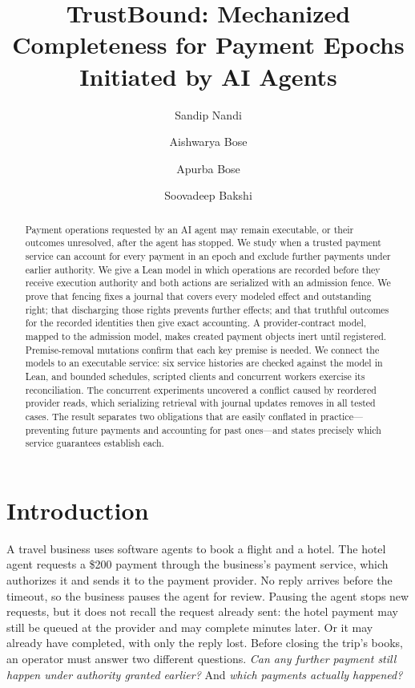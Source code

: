 \documentclass[runningheads]{llncs}
\begin{document}
\title{TrustBound: Mechanized Completeness for Payment Epochs Initiated by AI Agents}
\author{Sandip Nandi \and Aishwarya Bose \and Apurba Bose \and Soovadeep Bakshi}
\maketitle

\begin{abstract}
Payment operations requested by an AI agent may remain executable, or their
outcomes unresolved, after the agent has stopped. We study when a trusted
payment service can account for every payment in an epoch and exclude further
payments under earlier authority. We give a Lean model in which operations are
recorded before they receive execution authority and both actions are
serialized with an admission fence. We prove that fencing fixes a journal that
covers every modeled effect and outstanding right; that discharging those
rights prevents further effects; and that truthful outcomes for the recorded
identities then give exact accounting. A provider-contract model, mapped to the
admission model, makes created payment objects inert until registered.
Premise-removal mutations confirm that each key premise is needed. We connect
the models to an executable service: six service histories are checked against
the model in Lean, and bounded schedules, scripted clients and concurrent
workers exercise its reconciliation. The concurrent experiments uncovered a
conflict caused by reordered provider reads, which serializing retrieval with
journal updates removes in all tested cases. The result separates two
obligations that are easily conflated in practice---preventing future payments
and accounting for past ones---and states precisely which service guarantees
establish each.
\end{abstract}

\section{Introduction}
\label{sec:intro}
A travel business uses software agents to book a flight and a hotel. The hotel
agent requests a \$200 payment through the business's payment service, which
authorizes it and sends it to the payment provider. No reply arrives before the
timeout, so the business pauses the agent for review. Pausing the agent stops
new requests, but it does not recall the request already sent: the hotel
payment may still be queued at the provider and may complete minutes later. Or
it may already have completed, with only the reply lost. Before closing the
trip's books, an operator must answer two different questions. \emph{Can any
further payment still happen under authority granted earlier?} And \emph{which
payments actually happened?}
\end{document}
